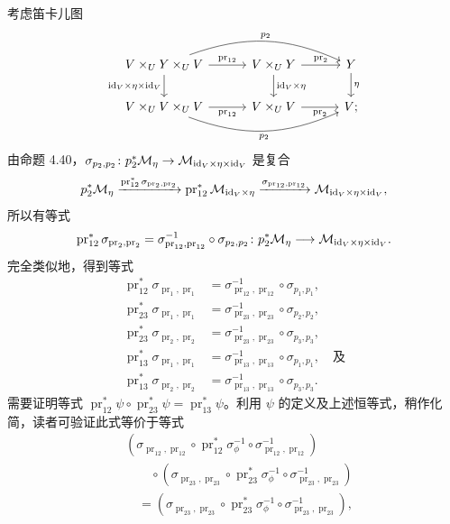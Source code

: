 考虑笛卡儿图
\[
\begin{tikzcd}[column sep=3em]
 V\times_U Y\times_U V\arrow[r,"{\operatorname{pr}_{12}}"]\arrow[rr,bend left=22,"{p_2}"]\arrow[d,"{\id_V\times\eta\times\id_V}"']&V\times_U Y\arrow[r,"{\operatorname{pr}_2}"]\arrow[d,"{\id_V\times\eta}"]&Y\arrow[d,"{\eta}"]\\
 V\times_U V\times_U V\arrow[r,"{\operatorname{pr}_{12}}"']\arrow[rr,bend right=22,"{p_2}"']&V\times_U V\arrow[r,"{\operatorname{pr}_2}"']&V;
\end{tikzcd}
\]
由命题 4.40，$\sigma_{p_2,p_2}\colon p_2^*\mathcal M_\eta\to\mathcal M_{\mathrm{id}_V\times\eta\times\mathrm{id}_V}$ 是复合
\[
 p_2^*\mathcal M_\eta\xrightarrow{\operatorname{pr}_{12}^*\sigma_{\operatorname{pr}_2,\operatorname{pr}_2}}
 \operatorname{pr}_{12}^*\mathcal M_{\mathrm{id}_V\times\eta}
 \xrightarrow{\sigma_{\operatorname{pr}_{12},\operatorname{pr}_{12}}}\mathcal M_{\mathrm{id}_V\times\eta\times\mathrm{id}_V},
\]
所以有等式
\[
 \operatorname{pr}_{12}^*\sigma_{\operatorname{pr}_2,\operatorname{pr}_2}
 =\sigma_{\operatorname{pr}_{12},\operatorname{pr}_{12}}^{-1}\circ\sigma_{p_2,p_2}
 \colon p_2^*\mathcal M_\eta\longrightarrow\mathcal M_{\mathrm{id}_V\times\eta\times\mathrm{id}_V}.
\]
完全类似地，得到等式
\[
\begin{aligned}
 \operatorname{pr}_{12}^*\sigma_{\operatorname{pr}_1,\operatorname{pr}_1}
 &=\sigma_{\operatorname{pr}_{12},\operatorname{pr}_{12}}^{-1}\circ\sigma_{p_1,p_1},\\
 \operatorname{pr}_{23}^*\sigma_{\operatorname{pr}_1,\operatorname{pr}_1}
 &=\sigma_{\operatorname{pr}_{23},\operatorname{pr}_{23}}^{-1}\circ\sigma_{p_2,p_2},\\
 \operatorname{pr}_{23}^*\sigma_{\operatorname{pr}_2,\operatorname{pr}_2}
 &=\sigma_{\operatorname{pr}_{23},\operatorname{pr}_{23}}^{-1}\circ\sigma_{p_3,p_3},\\
 \operatorname{pr}_{13}^*\sigma_{\operatorname{pr}_1,\operatorname{pr}_1}
 &=\sigma_{\operatorname{pr}_{13},\operatorname{pr}_{13}}^{-1}\circ\sigma_{p_1,p_1},\quad\text{及}\\
 \operatorname{pr}_{13}^*\sigma_{\operatorname{pr}_2,\operatorname{pr}_2}
 &=\sigma_{\operatorname{pr}_{13},\operatorname{pr}_{13}}^{-1}\circ\sigma_{p_3,p_3}.
\end{aligned}
\]
需要证明等式 $\operatorname{pr}_{12}^*\psi\circ\operatorname{pr}_{23}^*\psi=\operatorname{pr}_{13}^*\psi$。利用 $\psi$ 的定义及上述恒等式，稍作化简，读者可验证此式等价于等式
\[
\begin{aligned}
 &(\sigma_{\operatorname{pr}_{12},\operatorname{pr}_{12}}
 \circ\operatorname{pr}_{12}^*\sigma_\phi^{-1}\circ\sigma_{\operatorname{pr}_{12},\operatorname{pr}_{12}}^{-1})\\
 &\qquad\circ(\sigma_{\operatorname{pr}_{23},\operatorname{pr}_{23}}
 \circ\operatorname{pr}_{23}^*\sigma_\phi^{-1}\circ\sigma_{\operatorname{pr}_{23},\operatorname{pr}_{23}}^{-1})\\
 &\quad=(\sigma_{\operatorname{pr}_{23},\operatorname{pr}_{23}}
 \circ\operatorname{pr}_{23}^*\sigma_\phi^{-1}\circ\sigma_{\operatorname{pr}_{23},\operatorname{pr}_{23}}^{-1}),
\end{aligned}
\]

